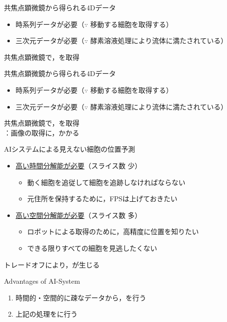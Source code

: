 \begin{frame}{共焦点顕微鏡から得られる4Dデータ}
    \begin{itemize}
        \item 時系列データが必要（$\because$ 移動する細胞を取得する）
        \item 三次元データが必要（$\because$ 酵素溶液処理により流体に満たされている）
    \end{itemize}
    \ra 共焦点顕微鏡\cite{paddock2000principles}で，を取得
    \\
\end{frame}
\begin{frame}[noframenumbering]{共焦点顕微鏡から得られる4Dデータ}
    \begin{itemize}
        \item 時系列データが必要（$\because$ 移動する細胞を取得する）
        \item 三次元データが必要（$\because$ 酵素溶液処理により流体に満たされている）
    \end{itemize}
    \ra 共焦点顕微鏡\cite{paddock2000principles}で，を取得
    \\\ra {}：画像の取得に，かかる
\end{frame}

\begin{frame}{AIシステムによる見えない細胞の位置予測}
    \begin{itemize}
        \item \uline{高い時間分解能が必要}（スライス数 少）
        \begin{itemize}
            \item 動く細胞を追従して細胞を追跡しなければならない
            \item 元住所を保持するために，FPSは上げておきたい
        \end{itemize}
        \vspace{.3zh}
        \item \uline{高い空間分解能が必要}（スライス数 多）
        \begin{itemize}
            \item ロボットによる取得のために，高精度に位置を知りたい
            \item できる限りすべての細胞を見逃したくない
        \end{itemize}
    \end{itemize}
    \vs
    \Ra トレードオフにより，が生じる
    \vspace{1.5zh}
    \begin{block}{Advantages of AI-System}
        \begin{enumerate}
            \item 時間的・空間的に疎なデータから，を行う
            \item 上記の処理をに行う
        \end{enumerate}
    \end{block}
\end{frame}